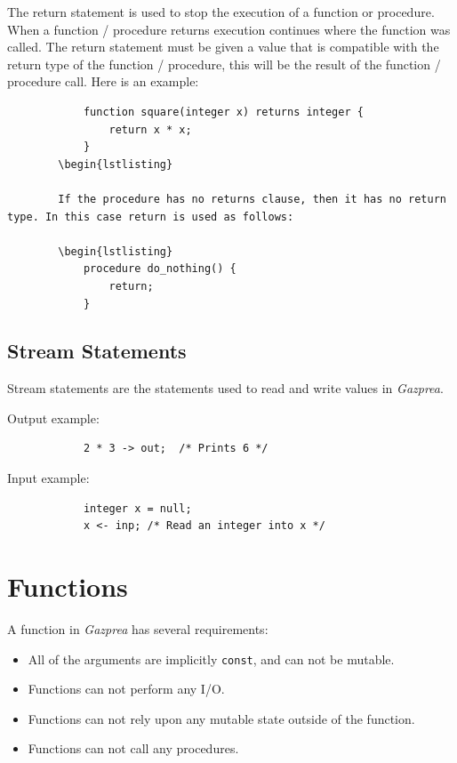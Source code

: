 \documentclass{article}
\begin{document}
		The return statement is used to stop the execution of a function or procedure.  When a function / procedure
		returns execution continues where the function was called. The return statement must be given a value that is
		compatible with the return type of the function / procedure, this will be the result of the function / procedure
		call. Here is an example:

		\begin{lstlisting}
			function square(integer x) returns integer {
				return x * x;
			}
		\begin{lstlisting}

		If the procedure has no returns clause, then it has no return type. In this case return is used as follows:

		\begin{lstlisting}
			procedure do_nothing() {
				return;
			}
		\end{lstlisting}


	\subsection{Stream Statements}

		Stream statements are the statements used to read and write values in \textit{Gazprea}.

		Output example:

		\begin{lstlisting}
			2 * 3 -> out;  /* Prints 6 */
		\end{lstlisting}

		Input example:

		\begin{lstlisting}
			integer x = null;
			x <- inp; /* Read an integer into x */
		\end{lstlisting}


\section{Functions}\label{sec:function}

	A function in \textit{Gazprea} has several requirements:

	\begin{itemize}
		\item All of the arguments are implicitly \texttt{const}, and can not be mutable.
		\item Functions can not perform any I/O.
		\item Functions can not rely upon any mutable state outside of the function.
		\item Functions can not call any procedures.
	\end{itemize}
\end{document}
